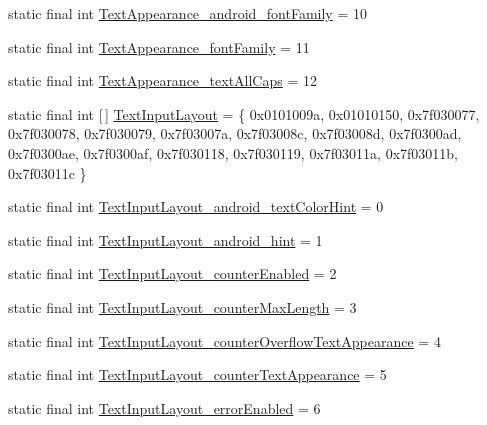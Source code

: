 \begin{DoxyCompactItemize}
static final int \mbox{\hyperlink{classandroid_1_1support_1_1design_1_1R_1_1styleable_a36e48b043501f3b5f0ba382b6bf750e5}{Text\+Appearance\+\_\+android\+\_\+font\+Family}} = 10
\item 
static final int \mbox{\hyperlink{classandroid_1_1support_1_1design_1_1R_1_1styleable_af3005c42b0e4178151f3fac95c8617e1}{Text\+Appearance\+\_\+font\+Family}} = 11
\item 
static final int \mbox{\hyperlink{classandroid_1_1support_1_1design_1_1R_1_1styleable_a9222a2b9d5bbe0564ce516e6b451f89c}{Text\+Appearance\+\_\+text\+All\+Caps}} = 12
\item 
static final int \mbox{[}$\,$\mbox{]} \mbox{\hyperlink{classandroid_1_1support_1_1design_1_1R_1_1styleable_ae01fd2fce65dc8639f3898586b0cedcf}{Text\+Input\+Layout}} = \{ 0x0101009a, 0x01010150, 0x7f030077, 0x7f030078, 0x7f030079, 0x7f03007a, 0x7f03008c, 0x7f03008d, 0x7f0300ad, 0x7f0300ae, 0x7f0300af, 0x7f030118, 0x7f030119, 0x7f03011a, 0x7f03011b, 0x7f03011c \}
\item 
static final int \mbox{\hyperlink{classandroid_1_1support_1_1design_1_1R_1_1styleable_ab77cba46b196f367d3323117ad3f3e37}{Text\+Input\+Layout\+\_\+android\+\_\+text\+Color\+Hint}} = 0
\item 
static final int \mbox{\hyperlink{classandroid_1_1support_1_1design_1_1R_1_1styleable_acacd639ef9f0f53a5980cca280c4454d}{Text\+Input\+Layout\+\_\+android\+\_\+hint}} = 1
\item 
static final int \mbox{\hyperlink{classandroid_1_1support_1_1design_1_1R_1_1styleable_a0b04736f1937ba38deb9170778f6d5a1}{Text\+Input\+Layout\+\_\+counter\+Enabled}} = 2
\item 
static final int \mbox{\hyperlink{classandroid_1_1support_1_1design_1_1R_1_1styleable_a556b29734154f6ea1a537f88e10da948}{Text\+Input\+Layout\+\_\+counter\+Max\+Length}} = 3
\item 
static final int \mbox{\hyperlink{classandroid_1_1support_1_1design_1_1R_1_1styleable_a45b455acc3c3acb00f7a36db187d9476}{Text\+Input\+Layout\+\_\+counter\+Overflow\+Text\+Appearance}} = 4
\item 
static final int \mbox{\hyperlink{classandroid_1_1support_1_1design_1_1R_1_1styleable_ab6dcd12d97c289aa435c8e54b432300e}{Text\+Input\+Layout\+\_\+counter\+Text\+Appearance}} = 5
\item 
static final int \mbox{\hyperlink{classandroid_1_1support_1_1design_1_1R_1_1styleable_ae2e5a1172c99efe3544ea5ffdaac92b6}{Text\+Input\+Layout\+\_\+error\+Enabled}} = 6
\item 

\end{DoxyCompactItemize}
